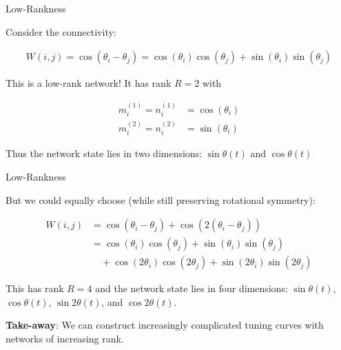 \documentclass{beamer}
\begin{document}
\begin{frame}{Low-Rankness}

    Consider the connectivity:

    \begin{align*}
        W(i,j) = \cos(\theta_i - \theta_j) = \cos(\theta_i) \cos(\theta_j) + \sin(\theta_i) \sin(\theta_j)
    \end{align*}

    This is a low-rank network! It has rank $R=2$ with

    \begin{align*}
        m^{(1)}_i = n^{(1)}_i &= \cos(\theta_i) \\
        m^{(2)}_i = n^{(2)}_i &= \sin(\theta_i)
    \end{align*}

    Thus the network state lies in two dimensions: $\sin\theta(t)$ and $\cos\theta(t)$
    
\end{frame}

\begin{frame}{Low-Rankness}

    But we could equally choose (while still preserving rotational symmetry):

    \begin{align*}
        W(i,j) &= \cos(\theta_i - \theta_j) + \cos(2(\theta_i - \theta_j)) \\
        &= \cos(\theta_i) \cos(\theta_j) + \sin(\theta_i) \sin(\theta_j) \\
        & \quad + \cos(2 \theta_i) \cos(2 \theta_j) + \sin(2 \theta_i) \sin(2\theta_j)
    \end{align*}

    This has rank $R=4$ and the network state lies in four dimensions: $\sin\theta(t)$, $\cos\theta(t)$, $\sin 2\theta(t)$, and $\cos 2\theta(t)$.

    \textbf{Take-away}: We can construct increasingly complicated tuning curves with networks of increasing rank.
    
\end{frame}
\end{document}
